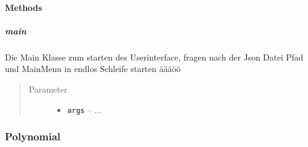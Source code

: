 \documentclass[letterpaper,10pt,ngerman]{sphinxmanual}
\begin{document}
\paragraph{Methods}
\label{com/linuxluigi/polynomial/Main:methods}

\subparagraph{main}
\label{com/linuxluigi/polynomial/Main:id1}

\begin{fulllineitems}
\label{com/linuxluigi/polynomial/Main:com.linuxluigi.polynomial.Main.main(String__)}
Die Main Klasse zum starten des Userinterface, fragen nach der Json Datei Pfad und MainMenu in endlos Schleife starten äääöö
\begin{quote}\begin{description}
\item[{Parameter}] \leavevmode\begin{itemize}
\item {} 
\textbf{\texttt{args}} -- 
...


\end{itemize}

\end{description}\end{quote}

\end{fulllineitems}



\subsubsection{Polynomial}
\label{com/linuxluigi/polynomial/Polynomial:polynomial}\label{com/linuxluigi/polynomial/Polynomial::doc}
\end{document}

